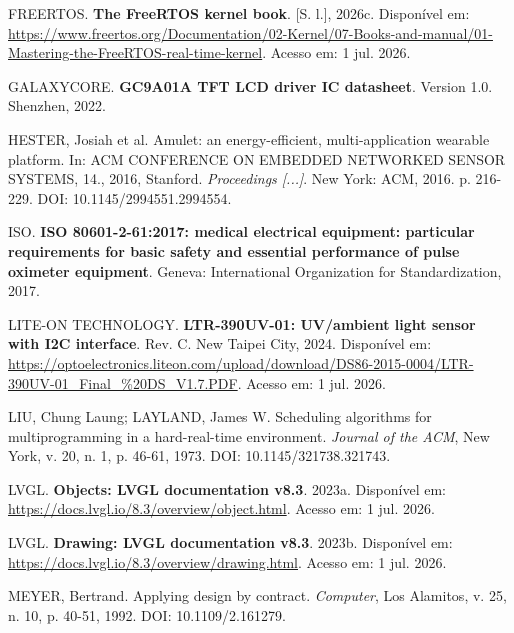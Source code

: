 \documentclass[a4paper,12pt]{article}
\begin{document}
\noindent FREERTOS. \textbf{The FreeRTOS kernel book}. [S. l.], 2026c. Disponível em: \url{https://www.freertos.org/Documentation/02-Kernel/07-Books-and-manual/01-Mastering-the-FreeRTOS-real-time-kernel}. Acesso em: 1 jul. 2026.\par\medskip

\noindent GALAXYCORE. \textbf{GC9A01A TFT LCD driver IC datasheet}. Version 1.0. Shenzhen, 2022.\par\medskip

\noindent HESTER, Josiah et al. Amulet: an energy-efficient, multi-application wearable platform. In: ACM CONFERENCE ON EMBEDDED NETWORKED SENSOR SYSTEMS, 14., 2016, Stanford. \emph{Proceedings [...]}. New York: ACM, 2016. p. 216-229. DOI: 10.1145/2994551.2994554.\par\medskip

\noindent ISO. \textbf{ISO 80601-2-61:2017: medical electrical equipment: particular requirements for basic safety and essential performance of pulse oximeter equipment}. Geneva: International Organization for Standardization, 2017.\par\medskip

\noindent LITE-ON TECHNOLOGY. \textbf{LTR-390UV-01: UV/ambient light sensor with I2C interface}. Rev. C. New Taipei City, 2024. Disponível em: \url{https://optoelectronics.liteon.com/upload/download/DS86-2015-0004/LTR-390UV-01_Final_%20DS_V1.7.PDF}. Acesso em: 1 jul. 2026.\par\medskip

\noindent LIU, Chung Laung; LAYLAND, James W. Scheduling algorithms for multiprogramming in a hard-real-time environment. \emph{Journal of the ACM}, New York, v. 20, n. 1, p. 46-61, 1973. DOI: 10.1145/321738.321743.\par\medskip

\noindent LVGL. \textbf{Objects: LVGL documentation v8.3}. 2023a. Disponível em: \url{https://docs.lvgl.io/8.3/overview/object.html}. Acesso em: 1 jul. 2026.\par\medskip

\noindent LVGL. \textbf{Drawing: LVGL documentation v8.3}. 2023b. Disponível em: \url{https://docs.lvgl.io/8.3/overview/drawing.html}. Acesso em: 1 jul. 2026.\par\medskip

\noindent MEYER, Bertrand. Applying design by contract. \emph{Computer}, Los Alamitos, v. 25, n. 10, p. 40-51, 1992. DOI: 10.1109/2.161279.\par\medskip
\end{document}
